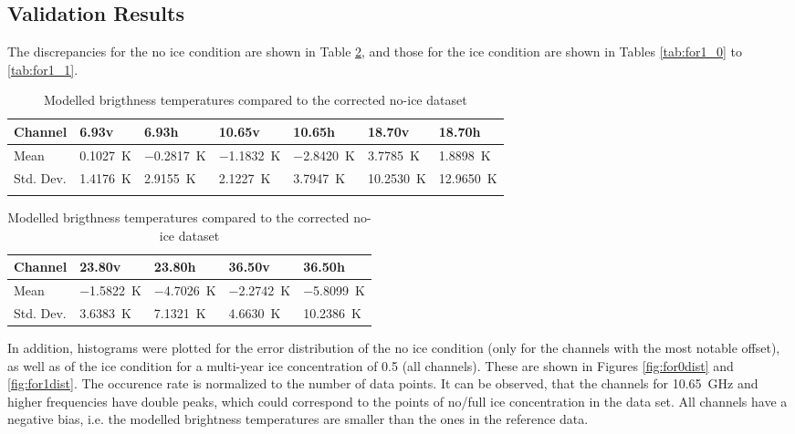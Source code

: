 \documentclass[11pt, a4paper]{article}
\begin{document}
\subsection{Validation Results}
\label{sec:ForValRes}

The discrepancies for the no ice condition are shown in Table \ref{tab:for0}, and those for the ice condition are shown in Tables \ref{tab:for1_0} to \ref{tab:for1_1}.

\begin{table}[h!]
\centering
\begin{tabular}{@{} l l l l l l l @{}}
Channel & 6.93v & 6.93h & 10.65v & 10.65h & 18.70v & 18.70h \\
\midrule
Mean & \SI{0.1027}{K} & \SI{-0.2817}{K} & \SI{-1.1832}{K} & \SI{-2.8420}{K} & \SI{3.7785}{K} & \SI{1.8898}{K} \\
Std. Dev. & \SI{1.4176}{K} & \SI{2.9155}{K} & \SI{2.1227}{K} & \SI{3.7947}{K} & \SI{10.2530}{K} & \SI{12.9650}{K} \\
\midrule
\tabularnewline
\end{tabular}
\begin{tabular}{@{} l l l l l @{}}
Channel & 23.80v & 23.80h & 36.50v & 36.50h \\
\midrule
Mean & \SI{-1.5822}{K} & \SI{-4.7026}{K} & \SI{-2.2742}{K} & \SI{-5.8099}{K} \\
Std. Dev. & \SI{3.6383}{K} & \SI{7.1321}{K} & \SI{4.6630}{K} & \SI{10.2386}{K} \\
\midrule
\end{tabular}
\caption{Modelled brigthness temperatures compared to the corrected no-ice dataset}
\label{tab:for0}
\end{table}

In addition, histograms were plotted for the error distribution of the no ice condition (only for the channels with the most notable offset), as well as of the ice condition for a multi-year ice concentration of 0.5 (all channels). These are shown in Figures \ref{fig:for0dist} and \ref{fig:for1dist}. The occurence rate is normalized to the number of data points. It can be observed, that the channels for \SI{10.65}{GHz} and higher frequencies have double peaks, which could correspond to the points of no/full ice concentration in the data set. All channels have a negative bias, i.e. the modelled brightness temperatures are smaller than the ones in the reference data. \\
\end{document}
